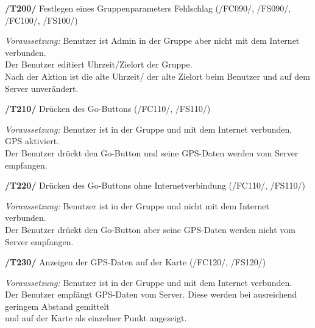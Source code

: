 \textbf{/T200/} Festlegen eines Gruppenparameters Fehlschlag (/FC090/, /FS090/, /FC100/, /FS100/)\\
\begin{center}
\vspace{-\parskip}
\begin{minipage}[t]{0.9\textwidth}
\emph{Voraussetzung:} Benutzer ist Admin in der Gruppe aber nicht mit dem Internet verbunden.\\
Der Benutzer editiert Uhrzeit/Zielort der Gruppe.                                      \\
Nach der Aktion ist die alte Uhrzeit/ der alte Zielort beim Benutzer und auf dem Server unverändert.\\
\end{minipage}
\end{center}

\textbf{/T210/} Drücken des Go-Buttons (/FC110/, /FS110/)\\
\begin{center}
\vspace{-\parskip}
\begin{minipage}[t]{0.9\textwidth}
\emph{Voraussetzung:} Benutzer ist in der Gruppe und mit dem Internet verbunden, GPS aktiviert.\\
Der Benutzer drückt den Go-Button und seine GPS-Daten werden vom Server empfangen.       \\
\end{minipage}
\end{center}

\textbf{/T220/} Drücken des Go-Buttons ohne Internetverbindung (/FC110/, /FS110/)\\
\begin{center}
\vspace{-\parskip}
\begin{minipage}[t]{0.9\textwidth}
\emph{Voraussetzung:} Benutzer ist in der Gruppe und nicht mit dem Internet verbunden.           \\
Der Benutzer drückt den Go-Button aber seine GPS-Daten werden nicht vom Server empfangen.  \\
\end{minipage}
\end{center}

\textbf{/T230/} Anzeigen der GPS-Daten auf der Karte (/FC120/, /FS120/)\\
\begin{center}
\vspace{-\parskip}
\begin{minipage}[t]{0.9\textwidth}
\emph{Voraussetzung:} Benutzer ist in der Gruppe und mit dem Internet verbunden.                                     \\
Der Benutzer empfängt GPS-Daten vom Server. Diese werden bei ausreichend geringem Abstand gemittelt            \\
und auf der Karte als einzelner Punkt angezeigt.                                                                \\
\end{minipage}
\end{center}

